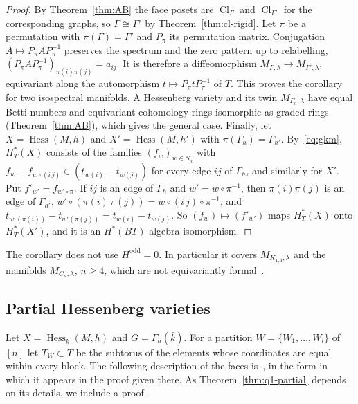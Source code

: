 \documentclass[11pt,a4paper]{article}
\numberwithin{equation}{section}
\theoremstyle{plain}
\theoremstyle{definition}
\theoremstyle{remark}
\newcommand{\HT}{H^{*}_{T}}
\DeclareMathOperator{\Hess}{Hess}
\DeclareMathOperator{\Cl}{Cl}
\begin{document}
\begin{proof}
By Theorem~\ref{thm:AB} the face posets are $\Cl_\Gamma$ and $\Cl_{\Gamma'}$ for the corresponding graphs, so $\Gamma\cong\Gamma'$ by Theorem~\ref{thm:cl-rigid}. Let $\pi$ be a permutation with $\pi(\Gamma)=\Gamma'$ and $P_\pi$ its permutation matrix. Conjugation $A\mapsto P_\pi AP_\pi^{-1}$ preserves the spectrum and the zero pattern up to relabelling, $(P_\pi AP_\pi^{-1})_{\pi(i)\pi(j)}=a_{ij}$. It is therefore a diffeomorphism $M_{\Gamma,\lambda}\to M_{\Gamma',\lambda}$, equivariant along the automorphism $t\mapsto P_\pi tP_\pi^{-1}$ of $T$. This proves the corollary for two isospectral manifolds. A Hessenberg variety and its twin $M_{\Gamma_h,\lambda}$ have equal Betti numbers and equivariant cohomology rings isomorphic as graded rings (Theorem~\ref{thm:AB}), which gives the general case. Finally, let $X=\Hess(M,h)$ and $X'=\Hess(M,h')$ with $\pi(\Gamma_h)=\Gamma_{h'}$. By~\eqref{eq:gkm}, $\HT(X)$ consists of the families $(f_w)_{w\in S_n}$ with $f_w-f_{w\circ(i\,j)}\in(t_{w(i)}-t_{w(j)})$ for every edge $ij$ of $\Gamma_h$, and similarly for $X'$. Put $f'_{w'}=f_{w'\circ\pi}$. If $ij$ is an edge of $\Gamma_h$ and $w'=w\circ\pi^{-1}$, then $\pi(i)\pi(j)$ is an edge of $\Gamma_{h'}$, $w'\circ(\pi(i)\,\pi(j))=w\circ(i\,j)\circ\pi^{-1}$, and $t_{w'(\pi(i))}-t_{w'(\pi(j))}=t_{w(i)}-t_{w(j)}$. So $(f_w)\mapsto(f'_{w'})$ maps $\HT(X)$ onto $\HT(X')$, and it is an $H^*(BT)$-algebra isomorphism.
\end{proof}

The corollary does not use $H^{\mathrm{odd}}=0$. In particular it covers $M_{K_{1,3},\lambda}$ and the manifolds $M_{C_n,\lambda}$, $n\geqslant4$, which are not equivariantly formal~\cite{AB24,AMS23}.

\subsection{Partial Hessenberg varieties}\label{sec:partial}
Let $X=\Hess_{\bar k}(M,h)$ and $G=\Gamma_h(\bar k)$. For a partition $W=\{W_1,\dots,W_l\}$ of $[n]$ let $T_W\subset T$ be the subtorus of the elements whose coordinates are equal within every block. The following description of the faces is~\cite[Thm.~2]{AB24}, in the form in which it appears in the proof given there. As Theorem~\ref{thm:q1-partial} depends on its details, we include a proof.
\end{document}
